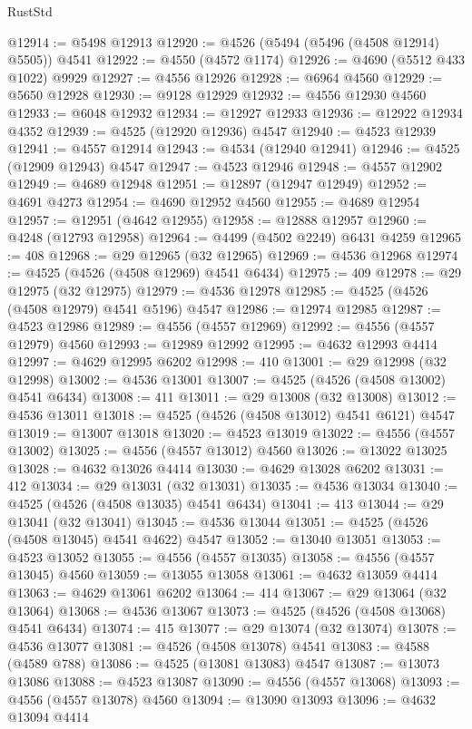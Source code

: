 \begin{lexlean}{RustStd}
\begin{coremodule}
@12914 := @5498 @12913
@12920 := @4526 (@5494 (@5496 (@4508 @12914) @5505)) @4541
@12922 := @4550 (@4572 @1174)
@12926 := @4690 (@5512 @433 @1022) @9929
@12927 := @4556 @12926
@12928 := @6964 @4560
@12929 := @5650 @12928
@12930 := @9128 @12929
@12932 := @4556 @12930 @4560
@12933 := @6048 @12932
@12934 := @12927 @12933
@12936 := @12922 @12934 @4352
@12939 := @4525 (@12920 @12936) @4547
@12940 := @4523 @12939
@12941 := @4557 @12914
@12943 := @4534 (@12940 @12941)
@12946 := @4525 (@12909 @12943) @4547
@12947 := @4523 @12946
@12948 := @4557 @12902
@12949 := @4689 @12948
@12951 := @12897 (@12947 @12949)
@12952 := @4691 @4273
@12954 := @4690 @12952 @4560
@12955 := @4689 @12954
@12957 := @12951 (@4642 @12955)
@12958 := @12888 @12957
@12960 := @4248 (@12793 @12958)
@12964 := @4499 (@4502 @2249) @6431 @4259
@12965 := 408
@12968 := @29 @12965 (@32 @12965)
@12969 := @4536 @12968
@12974 := @4525 (@4526 (@4508 @12969) @4541 @6434)
@12975 := 409
@12978 := @29 @12975 (@32 @12975)
@12979 := @4536 @12978
@12985 := @4525 (@4526 (@4508 @12979) @4541 @5196) @4547
@12986 := @12974 @12985
@12987 := @4523 @12986
@12989 := @4556 (@4557 @12969)
@12992 := @4556 (@4557 @12979) @4560
@12993 := @12989 @12992
@12995 := @4632 @12993 @4414
@12997 := @4629 @12995 @6202
@12998 := 410
@13001 := @29 @12998 (@32 @12998)
@13002 := @4536 @13001
@13007 := @4525 (@4526 (@4508 @13002) @4541 @6434)
@13008 := 411
@13011 := @29 @13008 (@32 @13008)
@13012 := @4536 @13011
@13018 := @4525 (@4526 (@4508 @13012) @4541 @6121) @4547
@13019 := @13007 @13018
@13020 := @4523 @13019
@13022 := @4556 (@4557 @13002)
@13025 := @4556 (@4557 @13012) @4560
@13026 := @13022 @13025
@13028 := @4632 @13026 @4414
@13030 := @4629 @13028 @6202
@13031 := 412
@13034 := @29 @13031 (@32 @13031)
@13035 := @4536 @13034
@13040 := @4525 (@4526 (@4508 @13035) @4541 @6434)
@13041 := 413
@13044 := @29 @13041 (@32 @13041)
@13045 := @4536 @13044
@13051 := @4525 (@4526 (@4508 @13045) @4541 @4622) @4547
@13052 := @13040 @13051
@13053 := @4523 @13052
@13055 := @4556 (@4557 @13035)
@13058 := @4556 (@4557 @13045) @4560
@13059 := @13055 @13058
@13061 := @4632 @13059 @4414
@13063 := @4629 @13061 @6202
@13064 := 414
@13067 := @29 @13064 (@32 @13064)
@13068 := @4536 @13067
@13073 := @4525 (@4526 (@4508 @13068) @4541 @6434)
@13074 := 415
@13077 := @29 @13074 (@32 @13074)
@13078 := @4536 @13077
@13081 := @4526 (@4508 @13078) @4541
@13083 := @4588 (@4589 @788)
@13086 := @4525 (@13081 @13083) @4547
@13087 := @13073 @13086
@13088 := @4523 @13087
@13090 := @4556 (@4557 @13068)
@13093 := @4556 (@4557 @13078) @4560
@13094 := @13090 @13093
@13096 := @4632 @13094 @4414

\end{coremodule}
\end{lexlean}
